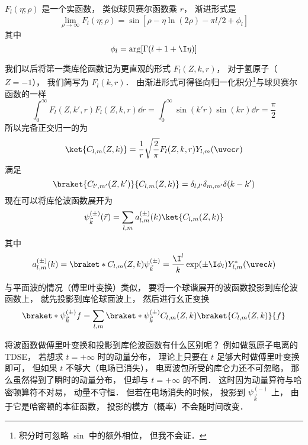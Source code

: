 $F_l(\eta; \rho)$ 是一个实函数， 类似球贝赛尔函数乘 $r$， 渐进形式是
\begin{equation}
\lim_{\rho\to \infty} F_l(\eta; \rho) = \sin[\rho - \eta\ln(2\rho) - \pi l/2 + \phi_l]
\end{equation}
其中
\begin{equation}
\phi_l = \arg[\Gamma(l+1+\I\eta)]
\end{equation}

我们以后将第一类库伦函数记为更直观的形式 $F_l(Z, k, r)$， 对于氢原子（$Z = -1$）， 我们简写为 $F_l(k, r)$． 由渐进形式可得径向归一化积分\footnote{积分时可忽略 $\sin$ 中的额外相位， 但我不会证．}与球贝赛尔函数的一样
\begin{equation}
\int_0^\infty F_l(Z, k', r)F_l(Z, k, r) \dd{r} = \int_0^\infty \sin(k'r)\sin(kr) \dd{r} = \frac{\pi}{2}
\end{equation}
所以完备正交归一的为
\begin{equation}
\ket{C_{l,m}(Z,k)} = \frac{1}{r} \sqrt{\frac{2}{\pi}} F_l(Z,k,r) Y_{l,m}(\uvec r)
\end{equation}
满足
\begin{equation}
\braket{C_{l',m'}(Z,k')}{C_{l,m}(Z,k)} = \delta_{l,l'}\delta_{m,m'}\delta(k-k')
\end{equation}
现在可以将库伦波函数展开为
\begin{equation}
\psi_{\vec k}^{(\pm)}(\vec r) =  \sum_{l,m} a_{l,m}^{(\pm)}(k) \ket{C_{l,m}(Z,k)}
\end{equation}
其中
\begin{equation}%
a_{l,m}^{(\pm)}(k) =  \braket*{C_{l,m}(Z,k)}{\psi_{\vec k}^{(\pm)}} = \frac{\I^l}{k} \exp(\pm\I\phi_l) Y_{l,m}^* (\uvec k)
\end{equation}

与平面波的情况（傅里叶变换）类似， 要将一个球谐展开的波函数投影到库伦波函数上， 就先投影到库伦球面波上， 然后进行幺正变换
\begin{equation}
\braket*{\psi_{\vec k}^{(\pm)}}{f} = \sum_{l,m} \braket*{\psi_{\vec k}^{(\pm)}}{C_{l,m}(Z,k)} \braket{C_{l,m}(Z,k)}{f}
\end{equation}

将波函数做傅里叶变换和投影到库伦波函数有什么区别呢？ 例如做氢原子电离的 TDSE， 若想求 $t = +\infty$ 时的动量分布， 理论上只要在 $t$ 足够大时做傅里叶变换即可， 但如果 $t$ 不够大（电场已消失）， 电离波包所受的库仑力还不可忽略， 那么虽然得到了瞬时的动量分布， 但却与 $t = +\infty$ 的不同． 这时因为动量算符与哈密顿算符不对易， 动量不守恒． 但若在电场消失的时候， 投影到 $\psi_{\vec k}^{(-)}$ 上， 由于它是哈密顿的本征函数， 投影的模方（概率）不会随时间改变．

